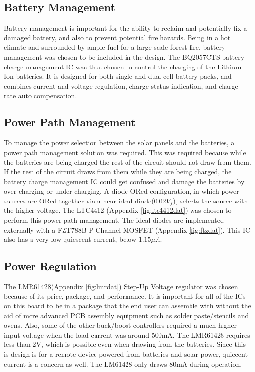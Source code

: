\documentclass{article}
\numberwithin{figure}{section}
\numberwithin{equation}{section}
\begin{document}
{\subsection{Battery Management} \label{sect:battery_just}
Battery management is important for the ability to reclaim and potentially fix a damaged battery, and also to prevent potential fire hazards. Being in a hot climate and surrounded by ample fuel for a large-scale forest fire, battery management was chosen to be included in the design. The BQ2057CTS battery charge management IC was thus chosen to control the charging of the Lithium-Ion batteries. It is designed for both single and dual-cell battery packs, and combines current and voltage regulation, charge status indication, and charge rate auto compensation.

\subsection{Power Path Management} \label{sect_pow_just}
To manage the power selection between the solar panels and the batteries, a power path management solution was required. This was required because while the batteries are being charged the rest of the circuit should not draw from them. If the rest of the circuit draws from them while they are being charged, the battery charge management IC could get confused and damage the batteries by over charging or under charging. A diode-ORed configuration, in which power sources are ORed together via a near ideal diode($0.02V_f$), selects the source with the higher voltage. The LTC4412 (Appendix \ref{fig:ltc4412dat}) was chosen to perform this power path management. The ideal diodes are implemented externally with a FZT788B P-Channel MOSFET (Appendix \ref{fig:ftzdat}). This IC also has a very low quiescent current, below $1.15\mu A$.

\subsection{Power Regulation} \label{sect:reg_just}
The LMR61428(Appendix \ref{fig:lmrdat}) Step-Up Voltage regulator was chosen because of its price, package, and performance. It is important for all of the ICs on this board to be in a package that the end user can assemble with without the aid of more advanced PCB assembly equipment such as solder paste/stencils and ovens. Also, some of the other buck/boost controllers required a much higher input voltage when the load current was around 500mA. The LMR61428 requires less than 2V, which is possible even when drawing from the batteries. Since this is design is for a remote device powered from batteries and solar power, quiecent current is a concern as well. The LM61428 only draws 80mA during operation.

}
\end{document}
